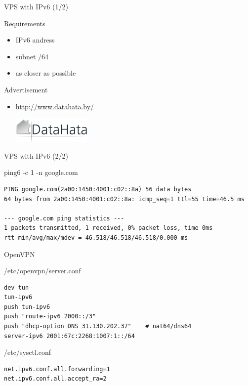 \documentclass[aspectratio=169]{beamer}
\begin{document}
\begin{frame}{VPS with IPv6 (1/2)}
    \begin{block}{Requirements}
        \begin{itemize}
        \item IPv6 andress
        \item subnet /64
        \item as closer as possible
        \end{itemize}
    \end{block}
    \pause
    \begin{block}{Advertisement}
        \begin{itemize}
        \item \url{http://www.datahata.by/} \par \includegraphics[width=0.3\textwidth]{datahata.png}
        \end{itemize}
    \end{block}
\end{frame}


\begin{frame}[fragile]{VPS with IPv6 (2/2)}
\begin{block}{ping6 -c 1 -n google.com}
\begin{verbatim}
PING google.com(2a00:1450:4001:c02::8a) 56 data bytes
64 bytes from 2a00:1450:4001:c02::8a: icmp_seq=1 ttl=55 time=46.5 ms

--- google.com ping statistics ---
1 packets transmitted, 1 received, 0% packet loss, time 0ms
rtt min/avg/max/mdev = 46.518/46.518/46.518/0.000 ms
\end{verbatim}
\end{block}

\end{frame}

\begin{frame}[fragile]{OpenVPN}
\begin{block}{/etc/openvpn/server.conf}
\begin{verbatim}
dev tun
tun-ipv6
push tun-ipv6
push "route-ipv6 2000::/3"
push "dhcp-option DNS 31.130.202.37"    # nat64/dns64
server-ipv6 2001:67c:2268:1007:1::/64
\end{verbatim}
\end{block}

\begin{block}{/etc/sysctl.conf}
\begin{verbatim}
net.ipv6.conf.all.forwarding=1
net.ipv6.conf.all.accept_ra=2
\end{verbatim}
\end{block}
\end{frame}
\end{document}

